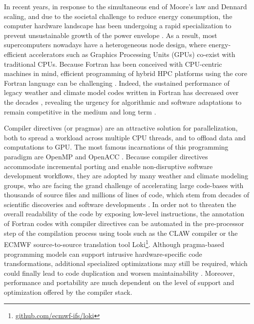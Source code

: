 \documentclass[gmd,manuscript,online]{copernicus}
\theoremstyle{theorem}
\theoremstyle{definition}
\theoremstyle{remark}
\theoremstyle{proposition}
\begin{document}
	In recent years, in response to the simultaneous end of Moore's law and Dennard scaling, and due to the societal challenge to reduce energy consumption, the computer hardware landscape has been undergoing a rapid specialization to prevent unsustainable growth of the power envelope \citep{muller19}. As a result, most supercomputers nowadays have a heterogeneous node design, where energy-efficient accelerators such as Graphics Processing Units (GPUs) co-exist with traditional CPUs. Because Fortran has been conceived with CPU-centric machines in mind, efficient programming of hybrid HPC platforms using the core Fortran language can be challenging \citep{mendez14, lawrence18}. Indeed, the sustained performance of legacy weather and climate model codes written in Fortran has decreased over the decades \citep{schulthess18}, revealing the urgency for algorithmic and software adaptations to remain competitive in the medium and long term \citep{bauer21}.

	Compiler directives (or pragmas) are an attractive solution for parallelization, both to spread a workload across multiple CPU threads, and to offload data and computations to GPU. The most famous incarnations of this programming paradigm are OpenMP \citep{dagum98} and OpenACC \citep{chandrasekaran17}. Because compiler directives accommodate incremental porting and enable non-disruptive software development workflows, they are adopted by many weather and climate modeling groups, who are facing the grand challenge of accelerating large code-bases with thousands of source files and millions of lines of code, which stem from decades of scientific discoveries and software developments \citep{lapillonne17, lapillonne20, randall22}. In order not to threaten the overall readability of the code by exposing low-level instructions, the annotation of Fortran codes with compiler directives can be automated in the pre-processor step of the compilation process using tools such as the CLAW compiler \citep{clement19} or the ECMWF source-to-source translation tool Loki\footnote{\url{github.com/ecmwf-ifs/loki}}. Although pragma-based programming models can support intrusive hardware-specific code transformations, additional specialized optimizations may still be required, which could finally lead to code duplication and worsen maintainability \citep{dahm23}. Moreover, performance and portability are much dependent on the level of support and optimization offered by the compiler stack.
\end{document}
